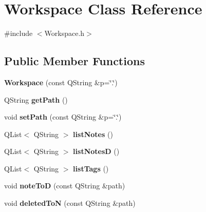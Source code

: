 \hypertarget{classWorkspace}{\section{\-Workspace \-Class \-Reference}
\label{classWorkspace}
}


{\ttfamily \#include $<$\-Workspace.\-h$>$}

\subsection*{\-Public \-Member \-Functions}
\begin{DoxyCompactItemize}
\item 
\hypertarget{classWorkspace_af16c8a4fe636d1cc98ac2eddfdfc2859}{{\bfseries \-Workspace} (const \-Q\-String \&p=\char`\"{}.\char`\"{})}\label{classWorkspace_af16c8a4fe636d1cc98ac2eddfdfc2859}

\item 
\hypertarget{classWorkspace_a86c8e878fb7982d984ad7a432a54dc29}{\-Q\-String {\bfseries get\-Path} ()}\label{classWorkspace_a86c8e878fb7982d984ad7a432a54dc29}

\item 
\hypertarget{classWorkspace_a3aec5fd32dcdbb1102dd5fdd68314310}{void {\bfseries set\-Path} (const \-Q\-String \&p=\char`\"{}.\char`\"{})}\label{classWorkspace_a3aec5fd32dcdbb1102dd5fdd68314310}

\item 
\hypertarget{classWorkspace_aa5d1d2a63c5c29d387f47c0d93483afd}{\-Q\-List$<$ \-Q\-String $>$ {\bfseries list\-Notes} ()}\label{classWorkspace_aa5d1d2a63c5c29d387f47c0d93483afd}

\item 
\hypertarget{classWorkspace_ad91083cb3da49ca2049bf15122db4dcc}{\-Q\-List$<$ \-Q\-String $>$ {\bfseries list\-Notes\-D} ()}\label{classWorkspace_ad91083cb3da49ca2049bf15122db4dcc}

\item 
\hypertarget{classWorkspace_aacd690ce475b83a0d01c7234a66a4762}{\-Q\-List$<$ \-Q\-String $>$ {\bfseries list\-Tags} ()}\label{classWorkspace_aacd690ce475b83a0d01c7234a66a4762}

\item 
\hypertarget{classWorkspace_a72442ff60a4b1a26a0974c8de9e4b81d}{void {\bfseries note\-To\-D} (const \-Q\-String \&path)}\label{classWorkspace_a72442ff60a4b1a26a0974c8de9e4b81d}

\item 
\hypertarget{classWorkspace_af33b62cf9249df5e5aed7ae2ed92b3d0}{void {\bfseries deleted\-To\-N} (const \-Q\-String \&path)}\label{classWorkspace_af33b62cf9249df5e5aed7ae2ed92b3d0}


\end{DoxyCompactItemize}
